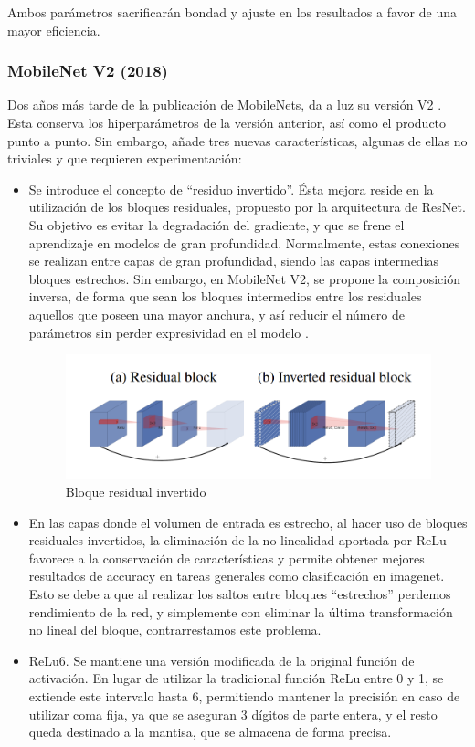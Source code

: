 Ambos parámetros sacrificarán bondad y ajuste en los resultados a favor de una mayor eficiencia.

\subsubsection{MobileNet V2 (2018)}

Dos años más tarde de la publicación de MobileNets, da a luz su versión V2  \cite{sandler2019mobilenetv2}. Esta conserva los hiperparámetros  de la versión anterior, así como el producto punto a punto. Sin embargo, añade tres nuevas características, algunas de ellas no triviales y que requieren experimentación:
\begin{itemize}
    \item Se introduce el concepto de ``residuo invertido''. Ésta mejora reside en la utilización de los bloques residuales, propuesto por la arquitectura de ResNet. Su objetivo es evitar la degradación del gradiente, y que se frene el aprendizaje en modelos de gran profundidad. Normalmente, estas conexiones se realizan entre capas de gran profundidad, siendo las capas intermedias bloques estrechos. Sin embargo, en MobileNet V2, se propone la composición inversa, de forma que sean los bloques intermedios entre los residuales aquellos que poseen una mayor anchura, y así reducir el número de parámetros sin perder expresividad en el modelo \cite{invertedresidualsv2}.
    \begin{figure}[H]
    	\label{invert}
    	\centering
    	\includegraphics[scale = 0.3]{imagenes/invertedres.png}
    	\caption{Bloque residual invertido}
    \end{figure}
    
     \item En las capas donde el volumen de entrada es estrecho, al hacer uso de bloques residuales invertidos, la eliminación de la no linealidad aportada por ReLu favorece a la conservación de características y permite obtener mejores resultados de accuracy en tareas generales como clasificación en imagenet. Esto se debe a que al realizar los saltos entre bloques ``estrechos'' perdemos rendimiento de la red, y simplemente con eliminar la última transformación no lineal del bloque, contrarrestamos este problema.
    \item ReLu6. Se mantiene una versión modificada de la original función de activación. En lugar de utilizar la tradicional función ReLu entre 0 y 1, se extiende este intervalo hasta 6, permitiendo mantener la precisión en caso de utilizar coma fija, ya que se aseguran 3 dígitos de parte entera, y el resto queda destinado a la mantisa, que se almacena de forma precisa.
\end{itemize}

